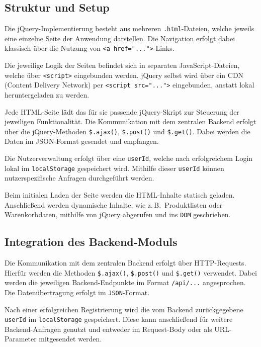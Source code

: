 \documentclass[oneside]{ausarbeitung}
\begin{document}
\subsection{Struktur und Setup}

Die jQuery-Implementierung besteht aus mehreren \texttt{.html}-Dateien, welche jeweils eine einzelne Seite der Anwendung darstellen. Die Navigation erfolgt dabei klassisch über die Nutzung von \texttt{<a href="...">}-Links.

Die jeweilige Logik der Seiten befindet sich in separaten JavaScript-Dateien, welche über \texttt{<script>} eingebunden werden. jQuery selbst wird über ein CDN (Content Delivery Network) per \texttt{<script src="...">} eingebunden, anstatt lokal heruntergeladen zu werden.

Jede HTML-Seite lädt das für sie passende jQuery-Skript zur Steuerung der jeweiligen Funktionalität. Die Kommunikation mit dem zentralen Backend erfolgt über die jQuery-Methoden \texttt{\$.\allowbreak ajax()}, \texttt{\$.\allowbreak post()} und \texttt{\$.\allowbreak get()}. Dabei werden die Daten im JSON-Format gesendet und empfangen.

Die Nutzerverwaltung erfolgt über eine \texttt{userId}, welche nach erfolgreichem Login lokal im \texttt{localStorage} gespeichert wird. Mithilfe dieser \texttt{userId} können nutzerspezifische Anfragen durchgeführt werden.

Beim initialen Laden der Seite werden die HTML-Inhalte statisch geladen. Anschließend werden dynamische Inhalte, wie z.\,B.\ Produktlisten oder Warenkorbdaten, mithilfe von jQuery abgerufen und ins \texttt{DOM} geschrieben.

\subsection{Integration des Backend-Moduls}

Die Kommunikation mit dem zentralen Backend erfolgt über HTTP-Requests. Hierfür werden die Methoden \verb|$.ajax()|, \verb|$.post()| und \verb|$.get()| verwendet. Dabei werden die jeweiligen Backend-Endpunkte im Format \texttt{/api/...} angesprochen. Die Datenübertragung erfolgt im \texttt{JSON}-Format.

Nach einer erfolgreichen Registrierung wird die vom Backend zurückgegebene \texttt{userId} im \texttt{localStorage} gespeichert. Diese kann anschließend für weitere Backend-Anfragen genutzt und entweder im Request-Body oder als URL-Parameter mitgesendet werden.
\end{document}
